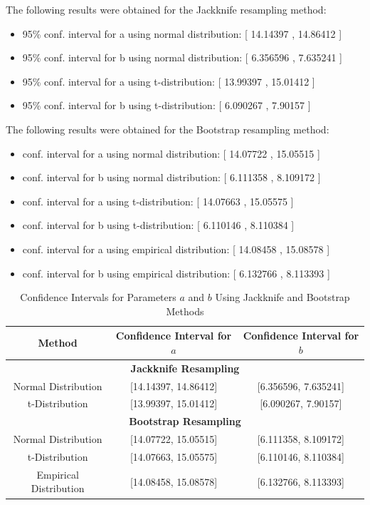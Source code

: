 \documentclass[]{article}
\begin{document}
\noindent The following results were obtained for the Jackknife resampling method:

\begin{itemize}
	\item 95\% conf. interval for a using normal distribution: [ 14.14397 , 14.86412 ]
	\item 95\% conf. interval for b using normal distribution: [ 6.356596 , 7.635241 ]
	\item 95\% conf. interval for a using t-distribution: [ 13.99397 , 15.01412 ]
	\item 95\% conf. interval for b using t-distribution: [ 6.090267 , 7.90157 ]
\end{itemize}


\noindent The following results were obtained for the Bootstrap resampling method:

\begin{itemize}
	\item conf. interval for a using normal distribution: [ 14.07722 , 15.05515 ]
	\item conf. interval for b using normal distribution: [ 6.111358 , 8.109172 ]
	\item conf. interval for a using t-distribution: [ 14.07663 , 15.05575 ]
	\item conf. interval for b using t-distribution: [ 6.110146 , 8.110384 ]
	\item conf. interval for a using empirical distribution: [ 14.08458 , 15.08578 ]
	\item conf. interval for b using empirical distribution: [ 6.132766 , 8.113393 ]
\end{itemize}

\begin{table}[h]
	\centering
	\begin{tabular}{|c|c|c|}
		\hline
		\textbf{Method} & \textbf{Confidence Interval for $a$} & \textbf{Confidence Interval for $b$} \\
		\hline
		\multicolumn{3}{|c|}{\textbf{Jackknife Resampling}} \\
		\hline
		Normal Distribution & [14.14397, 14.86412] & [6.356596, 7.635241] \\
		t-Distribution & [13.99397, 15.01412] & [6.090267, 7.90157] \\
		\hline
		\multicolumn{3}{|c|}{\textbf{Bootstrap Resampling}} \\
		\hline
		Normal Distribution & [14.07722, 15.05515] & [6.111358, 8.109172] \\
		t-Distribution & [14.07663, 15.05575] & [6.110146, 8.110384] \\
		Empirical Distribution & [14.08458, 15.08578] & [6.132766, 8.113393] \\
		\hline
	\end{tabular}
	\caption{Confidence Intervals for Parameters $a$ and $b$ Using Jackknife and Bootstrap Methods}
	\label{tab:ci_results}
\end{table}
\end{document}
